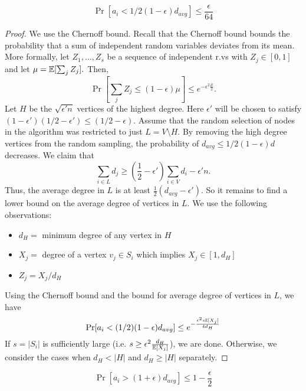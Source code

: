 \begin{lemma}
    $$
    \Pr[a_i < 1/2 (1 - \epsilon) d_{avg}] \leq \frac{\epsilon}{64}
    $$
\end{lemma}

\begin{proof}
    We use the Chernoff bound. Recall that the Chernoff bound bounds the probability that a sum of independent random variables deviates from its mean. More formally, let $Z_1,\ldots,Z_s$ be a sequence of independent r.vs with $Z_j \in [0,1]$ and let $\mu = \mathbb{E}[\sum_j Z_j].$ Then, 
    $$
    \Pr\left[ \sum_{j} Z_j \leq (1- \epsilon) \mu \right] \leq e^{-\epsilon^2 \frac{\mu}{2}}.
    $$
    Let $H$ be the $\sqrt{\epsilon' n}$ vertices of the highest degree. Here $\epsilon'$ will be chosen to satisfy $(1 - \epsilon')(1/2 - \epsilon') \leq (1/2 - \epsilon)$. Assume that the random selection of nodes in the algorithm was restricted to just $L = V \setminus H$. By removing the high degree vertices from the random sampling, the probability of $d_{avg} \leq 1/2 (1 - \epsilon) d$ decreases. We claim that
    $$
    \sum_{i \in L} d_j \geq \left( \frac{1}{2} - \epsilon' \right) \sum_{i \in V} d_i - \epsilon' n. 
    $$
    Thus, the average degree in $L$ is at least $\frac{1}{2} (d_{avg} - \epsilon')$. So it remains to find a lower bound on the average degree of vertices in $L$. We use the following observations:

    \begin{itemize}
        \item $d_H = $ minimum degree of any vertex in $H$
        \item $X_j = $ degree of a vertex $v_j \in S_i$ which implies $X_j \in [1,d_H]$
        \item $Z_j = X_j / d_H$ 
    \end{itemize}
    
    Using the Chernoff bound and the bound for average degree of vertices in $L$, we have
    $$
    \Pr[a_i < (1/2) (1 - \epsilon) d_{avg}] \leq e^{-\frac{\epsilon^2 s \mathbb{E}[X_j]}{4d_H}}
    $$
    If $s = |S_i|$ is sufficiently large (i.e. $s \geq \epsilon^2 \frac{d_H}{\mathbb{E}[X_j]}$), we are done. Otherwise, we consider the cases when $d_H < |H|$ and $d_H \geq |H|$ separately.
\end{proof}

\begin{lemma}
    $$
    \Pr[a_i > (1+\epsilon) d_{avg}] \leq 1 - \frac{\epsilon}{2}
    $$
\end{lemma}

